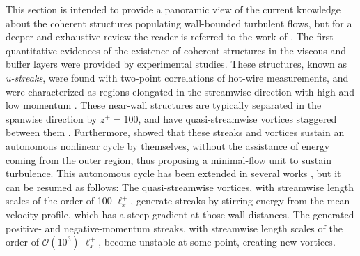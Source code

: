This section is intended to provide a panoramic view of the current knowledge about the coherent structures populating wall-bounded turbulent flows, but for a deeper and exhaustive review the reader is referred to the work of \citet{jimenez2018coherent}.
The first quantitative evidences of the existence of coherent structures in the viscous and buffer layers were provided by experimental studies.
These structures, known as \textit{u-streaks}, were found with two-point correlations of hot-wire measurements, and were characterized as regions elongated in the streamwise direction with high and low momentum \citep{kline1967structure,favre1967structure, blackwelder1972time}.
These near-wall structures are typically separated in the spanwise direction by $z^+=100$, and have quasi-streamwise vortices staggered between them \citep{robinson1991coherent,jimenez1991minimal}.
Furthermore, \citet{jimenez1991minimal} showed that these streaks and vortices sustain an autonomous nonlinear cycle by themselves, without the assistance of energy coming from the outer region, thus proposing a minimal-flow unit to sustain turbulence.
This autonomous cycle has been extended in several works \citep{waleffe1995hydrodynamic, jimenez1999autonomous, moehlis2004low}, but it can be resumed as follows:
The quasi-streamwise vortices, with streamwise length scales of the order of 100 $\ell_x^+$, generate streaks by stirring energy from the mean-velocity profile, which has a steep gradient at those wall distances.
The generated positive- and negative-momentum streaks, with streamwise length scales of the order of $\mathcal{O}(10^3)$ $\ell_x^+$, become unstable at some point, creating new vortices.

